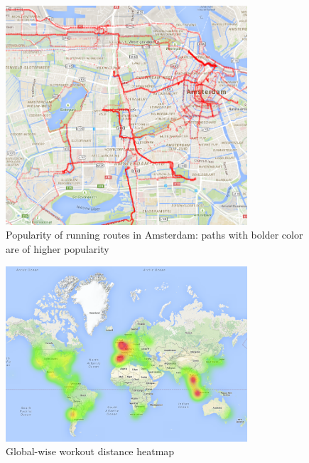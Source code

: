 \begin{figure}[h]
\centering
\includegraphics[width=90mm]{imgs/popularity.png}
\caption{Popularity of running routes in Amsterdam: paths with bolder color are of higher popularity  \label{viz:popularity}}
\end{figure}

\begin{figure}[h]
\centering
\includegraphics[width=90mm]{imgs/global.png}
\caption{Global-wise workout distance heatmap \label{viz:global}}
\end{figure}